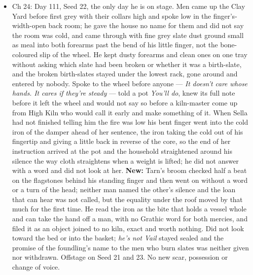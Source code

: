 \documentclass{design/chronicle}
\begin{document}
{\begin{itemize}[leftmargin=1.4em,itemsep=1pt,topsep=3pt,parsep=0pt]
\item Ch 24: Day 111, Seed 22, the only day he is on stage. Men came up the Clay Yard before first grey with their collars high and spoke low in the finger’s-width-open back room; he gave the house no name for them and did not say the room was cold, and came through with fine grey slate dust ground small as meal into both forearms past the bend of his little finger, not the bone-coloured slip of the wheel. He kept dusty forearms and clean ones on one tray without asking which slate had been broken or whether it was a birth-slate, and the broken birth-slates stayed under the lowest rack, gone around and entered by nobody. Spoke to the wheel before anyone — \emph{It doesn’t care whose hands. It cares if they’re steady} — told a pot \emph{You’ll do}, knew its full note before it left the wheel and would not say so before a kiln-master come up from High Kiln who would call it early and make something of it. When Sella had not finished telling him the fire was low his bent finger went into the cold iron of the damper ahead of her sentence, the iron taking the cold out of his fingertip and giving a little back in reverse of the core, so the end of her instruction arrived at the pot and the household straightened around his silence the way cloth straightens when a weight is lifted; he did not answer with a word and did not look at her. \textbf{New:} Tarn’s broom checked half a beat on the flagstones behind his standing finger and then went on without a word or a turn of the head; neither man named the other’s silence and the loan that can hear was not called, but the equality under the roof moved by that much for the first time. He read the iron as the bite that holds a vessel whole and can take the hand off a man, with no Grathic word for both mercies, and filed it as an object joined to no kiln, exact and worth nothing. Did not look toward the bed or into the basket; \emph{he’s not Vail} stayed sealed and the promise of the foundling’s name to the men who burn slates was neither given nor withdrawn. Offstage on Seed 21 and 23. No new scar, possession or change of voice.

\end{itemize}

\begin{itemize}[leftmargin=1.4em,itemsep=1pt,topsep=3pt,parsep=0pt]


\end{itemize}}
\end{document}
